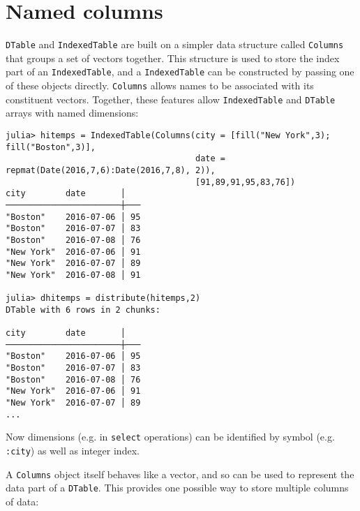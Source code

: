 \documentclass{memoir}
\begin{document}
\hypertarget{8684275108712699203}{}


\section{Named columns}



\texttt{DTable} and \texttt{IndexedTable} are built on a simpler data structure called \texttt{Columns} that groups a set of vectors together. This structure is used to store the index part of an \texttt{IndexedTable}, and a \texttt{IndexedTable} can be constructed by passing one of these objects directly. \texttt{Columns} allows names to be associated with its constituent vectors. Together, these features allow \texttt{IndexedTable} and \texttt{DTable} arrays with named dimensions:




\begin{verbatim}
julia> hitemps = IndexedTable(Columns(city = [fill("New York",3); fill("Boston",3)],
                                      date = repmat(Date(2016,7,6):Date(2016,7,8), 2)),
                                      [91,89,91,95,83,76])
city        date       │
───────────────────────┼───
"Boston"    2016-07-06 │ 95
"Boston"    2016-07-07 │ 83
"Boston"    2016-07-08 │ 76
"New York"  2016-07-06 │ 91
"New York"  2016-07-07 │ 89
"New York"  2016-07-08 │ 91

julia> dhitemps = distribute(hitemps,2)
DTable with 6 rows in 2 chunks:

city        date       │
───────────────────────┼───
"Boston"    2016-07-06 │ 95
"Boston"    2016-07-07 │ 83
"Boston"    2016-07-08 │ 76
"New York"  2016-07-06 │ 91
"New York"  2016-07-07 │ 89
...
\end{verbatim}



Now dimensions (e.g. in \texttt{select} operations) can be identified by symbol (e.g. \texttt{:city}) as well as integer index.



A \texttt{Columns} object itself behaves like a vector, and so can be used to represent the data part of a \texttt{DTable}. This provides one possible way to store multiple columns of data:
\end{document}
